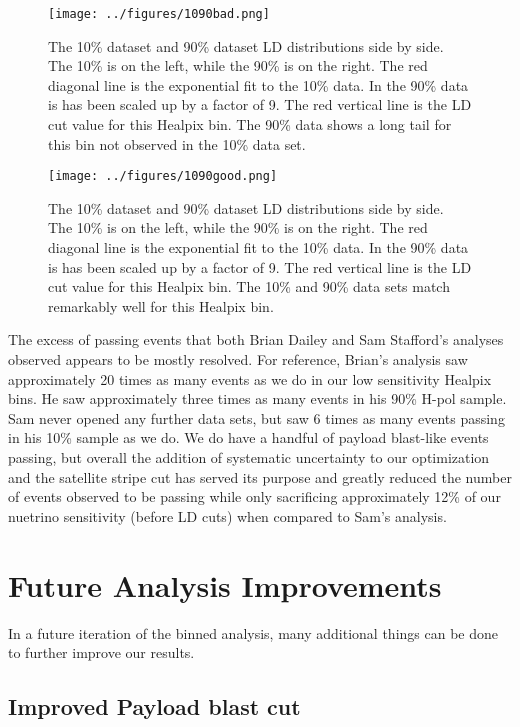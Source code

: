 \begin{figure}[h]
\centering
\texttt{[image: ../figures/1090bad.png]}
\caption[10\% and 90\% LD distributions for Healpix bin 3009]{The 10\% dataset and 90\% dataset LD distributions side by side.  The 10\% is on the left, while the 90\% is on the right.  The red diagonal line is the exponential fit to the 10\% data.  In the 90\% data is has been scaled up by a factor of 9.  The red vertical line is the LD cut value for this Healpix bin.  The 90\% data shows a long tail for this bin not observed in the 10\% data set.}
\label{fig:1090bad}
\end{figure}

\begin{figure}[h]
\centering
\texttt{[image: ../figures/1090good.png]}
\caption[10\% and 90\% LD distributions for Healpix bin 3031]{The 10\% dataset and 90\% dataset LD distributions side by side.  The 10\% is on the left, while the 90\% is on the right.  The red diagonal line is the exponential fit to the 10\% data.  In the 90\% data is has been scaled up by a factor of 9.  The red vertical line is the LD cut value for this Healpix bin.  The 10\% and 90\% data sets match remarkably well for this Healpix bin.}
\label{fig:1090good}
\end{figure}

The excess of passing events that both Brian Dailey and Sam Stafford's analyses observed appears to be mostly resolved.  For reference, Brian's analysis saw approximately 20 times as many events as we do in our low sensitivity Healpix bins.  He saw approximately three times as many events in his 90\% H-pol sample.  Sam never opened any further data sets, but saw 6 times as many events passing in his 10\% sample as we do.  We do have a handful of payload blast-like events passing, but overall the addition of systematic uncertainty to our optimization and the satellite stripe cut has served its purpose and greatly reduced the number of events observed to be passing while only sacrificing approximately 12\% of our nuetrino sensitivity (before LD cuts) when compared to Sam's analysis.


\section{Future Analysis Improvements}
In a future iteration of the binned analysis, many additional things can be done to further improve our results.

\subsection{Improved Payload blast cut}

